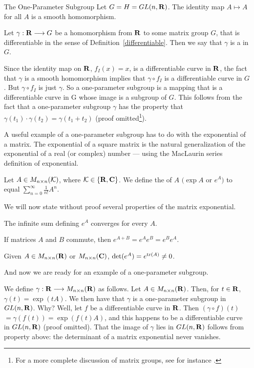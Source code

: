 \begin{section}{The One-Parameter Subgroup}
Let $G = H = GL(n, \mathbf{R})$.  The identity map $A \longmapsto A$ for all $A$ is a smooth homomorphism.

\begin{definition}
\label{oneparam}
Let $\gamma: \mathbf{R} \longrightarrow G$ be a homomorphism from $\mathbf{R}$ to some matrix group $G$, that is differentiable in the sense of Definition~\ref{differentiable}.  Then we say that $\gamma$ is a  in $G$.
\end{definition}

Since the identity map on $\mathbf{R}$, $f_I(x) = x$, is a differentiable curve in $\mathbf{R}$, the fact that $\gamma$ is a smooth homomorphism implies that $\gamma \circ f_I$ is a differentiable curve in $G$.  But $\gamma \circ f_I$ is just $\gamma$.  So a one-parameter subgroup is a mapping that is a differentiable curve in G whose image is a subgroup of $G$.  This follows from the fact that a one-parameter subgroup $\gamma$ has the property that $\gamma(t_1) \cdot \gamma(t_2) = \gamma(t_1 + t_2)$ (proof omitted\footnote{For a more complete discussion of matrix groups, see for instance \cite{curtis}.}).

A useful example of a one-parameter subgroup has to do with the exponential of a matrix.  The exponential of a square matrix is the natural generalization of the exponential of a real (or complex) number --- using the MacLaurin series definition of exponential.

\begin{definition}
\label{exp}
Let $A \in M_{n \times n}(\mathcal{K})$, where $\mathcal{K} \in \{ \mathbf{R}, \mathbf{C} \}$.  We define the  of $A$ $($$\exp A$ or $e^A$$)$ to equal $\sum_{n=0}^\infty \frac{1}{n!}A^n$.
\end{definition}

We will now state without proof several properties of the matrix exponential.

  The infinite sum defining $e^A$ converges for every $A$.

  If matrices $A$ and $B$ commute, then $e^{A+B} = e^Ae^B = e^Be^A$.

  Given $A \in M_{n \times n}(\mathbf{R})$ or $M_{n \times n}(\mathbf{C})$, $\det(e^A) = e^{\mathrm{tr}(A)} \not= 0$.

And now we are ready for an example of a one-parameter subgroup.

We define $\gamma: \mathbf{R} \longrightarrow M_{n \times n}(\mathbf{R})$ as follows.  Let $A \in M_{n \times n}(\mathbf{R})$.  Then, for $t \in \mathbf{R}$, $\gamma(t) = \exp(tA)$.  We then have that $\gamma$ is a one-parameter subgroup in $GL(n,\mathbf{R})$.  Why?  Well, let $f$ be a differentiable curve in $\mathbf{R}$.  Then $(\gamma \circ f)(t)$ $= \gamma(f(t)) = \exp(f(t)A)$, and this happens to be a differentiable curve in $GL(n,\mathbf{R})$ (proof omitted).  That the image of $\gamma$ lies in $GL(n,\mathbf{R})$ follows from property  above: the determinant of a matrix exponential never vanishes.


\end{section}
